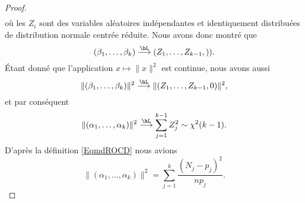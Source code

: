 \begin{proof}
\begin{subequations}
\begin{align}
		\end{align}
	\end{subequations}
	où les \( Z_i\) sont des variables aléatoires indépendantes et identiquement distribuées de distribution normale centrée réduite. Nous avons donc montré que
	\begin{equation}
		(\beta_1,\ldots, \beta_k)\stackrel{\hL}{\longrightarrow}(Z_1,\ldots, Z_{k-1},)).
	\end{equation}
	Étant donné que l'application \( x\mapsto \| x \|^2\) est continue, nous avons aussi
	\begin{equation}
		\| (\beta_1,\ldots, \beta_k) \|^2\stackrel{\hL}{\longrightarrow}\| (Z_1,\ldots, Z_{k-1},0) \|^2,
	\end{equation}
	et par conséquent
	\begin{equation}
		\| (\alpha_1,\ldots, \alpha_k) \|^2\stackrel{\hL}{\longrightarrow}\sum_{j=1}^{k-1}Z_j^2\sim\chi^2(k-1).
	\end{equation}
	D'après la définition \eqref{EqmdROCD} nous avions
	\begin{equation}
		\| (\alpha_1,\ldots, \alpha_k) \|^2=\sum_{j=1}^k\frac{ (N_j-p_j)^2 }{ np_j }.
	\end{equation}
\end{proof}
